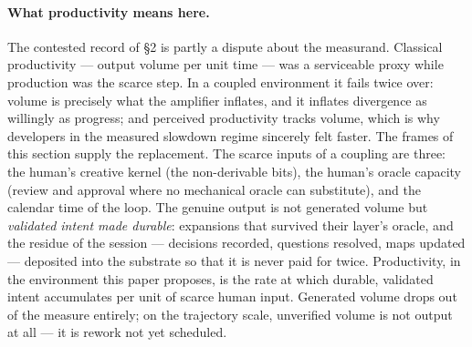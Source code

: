 \documentclass[11pt,a4paper,twocolumn]{article}
\begin{document}
\paragraph{What productivity means here.} The contested record of
\S2 is partly a dispute about the measurand. Classical
productivity --- output volume per unit time --- was a serviceable
proxy while production was the scarce step. In a coupled
environment it fails twice over: volume is precisely what the
amplifier inflates, and it inflates divergence as willingly as
progress; and perceived productivity tracks volume, which is why
developers in the measured slowdown regime sincerely felt
faster. The frames of this section supply the replacement. The
scarce inputs of a coupling are three: the human's creative kernel
(the non-derivable bits), the human's oracle capacity (review and
approval where no mechanical oracle can substitute), and the
calendar time of the loop. The genuine output is not generated
volume but \emph{validated intent made durable}: expansions that
survived their layer's oracle, and the residue of the session ---
decisions recorded, questions resolved, maps updated --- deposited
into the substrate so that it is never paid for twice.
Productivity, in the environment this paper proposes, is the rate
at which durable, validated intent accumulates per unit of scarce
human input. Generated volume drops out of the measure entirely;
on the trajectory scale, unverified volume is not output at all
--- it is rework not yet scheduled.
\end{document}
